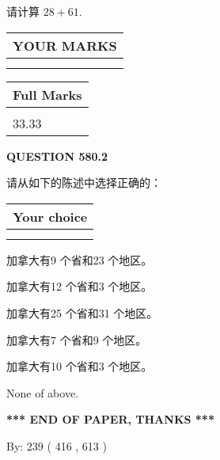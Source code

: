 \documentclass{ctexart}
\begin{document}
  
 
请计算 $ %
28 +  %
61 $.
 

 

 
  
\vspace{0.2in}
  
\noindent\begin{tabular}{|l|}
\hline
 YOUR MARKS  \\
\hline
 \\ 
 \\ 
\hline
\end{tabular}
\hspace{0.05in} \begin{tabular}{|l|}
\hline
 Full Marks  \\
\hline
 \\ 
33.33 \\
\hline
\end{tabular}
{\textbf{\Large{QUESTION
580.2 
}}}
  
  
请从如下的陈述中选择正确的：
  
  
\noindent\hspace{3.0in} \begin{tabular}{|l|}
\hline
Your choice \\
\hline
 \\ 
 \\ 
\hline
\end{tabular}
  
  
 
 
加拿大有9 个省和23 个地区。
 
 
加拿大有12 个省和3 个地区。
 
 
加拿大有25 个省和31 个地区。
 
 
加拿大有7 个省和9 个地区。
 
 
加拿大有10 个省和3 个地区。
 
 
 None of above.
 
 
   
   
 \vspace{0.2in}
 
   
   
   
   
\vspace{1.0in} 
{\textbf{\large{ *** END OF PAPER, THANKS *** }}} 
   
   
\hspace{1.0in} By: 
 239 ( 416 ,  613 )
   
\end{document}
